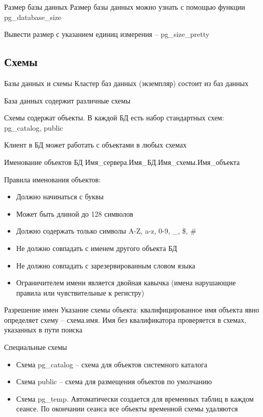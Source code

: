 \documentclass[12pt]{article}
\begin{document}
\begin{nota}{Размер базы данных}
    Размер базы данных можно узнать с помощью функции pg\_database\_size

    Вывести размер с указанием единиц измерения -- pg\_size\_pretty
\end{nota}

\newpage

\subsection{Схемы}

\begin{defin}{Базы данных и схемы}
    Кластер баз данных (экземпляр) состоит из баз данных 

    База данных содержит различные схемы 

    Схемы содержат объекты. В каждой БД есть набор стандартных схем: pg\_catalog, public

    Клиент в БД может работать с объектами в любых схемах 
\end{defin}

\begin{nota}{Именование объектов БД}
    Имя\_сервера.Имя\_БД.Имя\_схемы.Имя\_объекта

    Правила именования объектов:

    \begin{itemize}
        \item Должно начинаться с буквы 
        \item Может быть длиной до 128 символов 
        \item Должно содержать только символы A-Z, a-z, 0-9, \_, \$, \#
        \item Не должно совпадать с именем другого объекта БД 
        \item Не должно совпадать с зарезервированным словом языка 
        \item Ограничителем имени является двойная кавычка (имена нарушающие правила или чувствительные к регистру)
    \end{itemize}
\end{nota}

\begin{nota}{Разрешение имен}
    Указание схемы объекта: квалифицированное имя объекта явно определяет схему -- схема.имя. Имя без квалификатора проверяется в схемах, указанных в пути поиска 
\end{nota}

\begin{nota}{Специальные схемы}
    \begin{itemize}
        \item Схема pg\_catalog -- схема для объектов системного каталога
        \item Схема public -- схема для размещения объектов по умолчанию 
        \item Схема pg\_temp. Автоматически создается для временных таблиц в каждом сеансе. По окончании сеанса все объекты временной схемы удаляются 
    \end{itemize}
\end{nota}
\end{document}
